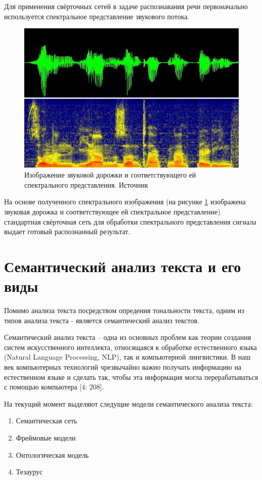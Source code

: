 Для применения свёрточных сетей в задаче распознавания речи первоначально используется спектральное представление звукового потока.

\begin{figure}[h]
\includegraphics[width=0.75\columnwidth]{./img/recur_10.jpg}
\centering
\caption{ Изображение звуковой дорожки и соответствующего ей спектрального представления. Источник \cite{9_recur}}
\label{pic:recur_10}
\end{figure}

На основе полученного спектрального изображения (на рисунке \ref{pic:recur_10} изображена звуковая дорожка и соответствующее ей спектральное представление) 
стандартная свёрточная сеть для обработки спектрального представления сигнала выдает готовый распознанный результат.

\section{Семантический анализ текста и его виды}

Помимо анализа текста посредством опредения тональности текста, одним из типов анализа текста - является
семантический анализ текстов.

Семантический анализ текста – одна из основных проблем как 
теории создания систем искусственного интеллекта, относящаяся 
к обработке естественного языка (Natural Language Processing, NLP), так
и компьютерной лингвистики. В наш век компьютерных технологий
чрезвычайно важно получать информацию на естественном языке и
сделать так, чтобы эта информация могла перерабатываться с помощью
компьютера [4: 208]. 

На текущий момент выделяют следущие модели семантического анализа текста:
\begin{enumerate}
  \item Семантическая сеть
  \item Фреймовые модели
  \item Онтологическая модель
  \item Тезаурус 
\end{enumerate}

